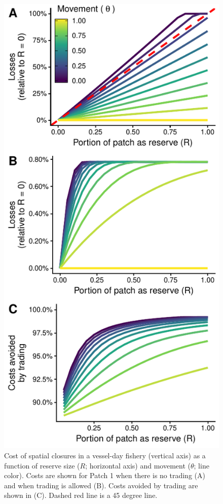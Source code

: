 \documentclass[12pt]{article}
\begin{document}
\begin{figure}[htbp]
\centering
\includegraphics{img/PNA_model.pdf}
\caption{\label{fig:PNA_model}Cost of spatial closures in a vessel-day fishery (vertical axis) as a function of reserve size ($R$; horizontal axis) and movement ($\theta$; line color). Costs are shown for Patch 1 when there is no trading (A) and when trading is allowed (B). Costs avoided by trading are shown in (C). Dashed red line is a 45 degree line.}
\end{figure}
\end{document}
